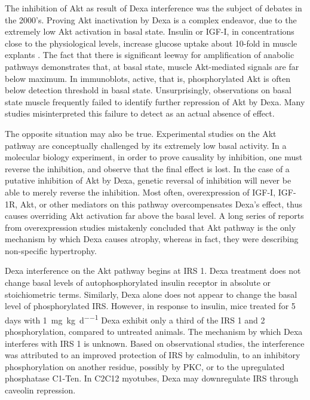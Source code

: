 \documentclass[12pt,english]{report}\usepackage[]{graphicx}\usepackage[]{color}
\begin{document}
The inhibition of Akt as result of Dexa interference was the subject
of debates in the 2000's. Proving Akt inactivation by Dexa is a complex
endeavor, due to the extremely low Akt activation in basal state.
Insulin or IGF-I, in concentrations close to the physiological levels,
increase glucose uptake about 10-fold in muscle explants \citep{weinstein1995glucocorticoid-induced}.
The fact that there is significant leeway for amplification of anabolic
pathways demonstrates that, at basal state, muscle Akt-mediated signals
are far below maximum. In immunoblots, active, that is, phosphorylated
Akt is often below detection threshold in basal state\citep{dardevet1995sensitivity}.
Unsurprisingly, observations on basal state muscle frequently failed
to identify further repression of Akt by Dexa. Many studies misinterpreted
this failure to detect as an actual absence of effect.

The opposite situation may also be true. Experimental studies on the
Akt pathway are conceptually challenged by its extremely low basal
activity. In a molecular biology experiment, in order to prove causality
by inhibition, one must reverse the inhibition, and observe that the
final effect is lost. In the case of a putative inhibition of Akt
by Dexa, genetic reversal of inhibition will never be able to merely
reverse the inhibition. Most often, overexpression of IGF-I, IGF-1R,
Akt, or other mediators on this pathway overcompensates Dexa's effect,
thus causes overriding Akt activation far above the basal level. A
long series of reports from overexpression studies mistakenly concluded
that Akt pathway is the only mechanism by which Dexa causes atrophy,
whereas in fact, they were describing non-specific hypertrophy.

Dexa interference on the Akt pathway begins at IRS 1. Dexa treatment
does not change basal levels of autophosphorylated insulin receptor
in absolute or stoichiometric terms\citep{saad1993modulation,corporeau2006adipose,ishizuka1995effect}.
Similarly, Dexa alone does not appear to change the basal level of
phosphorylated IRS. However, in response to insulin, mice treated
for 5 days with \SI{1}{\milli\gram\per\kilo\gram\per\day} Dexa exhibit
only a third of the IRS 1 and 2 phosphorylation, compared to untreated
animals\citep{rojas2003regulation}. The mechanism by which Dexa interferes
with IRS 1 is unknown. Based on observational studies, the interference
was attributed to an improved protection of IRS by calmodulin\citep{li2000binding},
to an inhibitory phosphorylation on another residue, possibly by PKC\citep{morgan200911beta-hydroxysteroid,ishizuka1995effect},
or to the upregulated phosphatase C1-Ten\citep{koh2013c1-ten}. In
C2C12 myotubes, Dexa may downregulate IRS through caveolin repression\citep{son2015dexamethasone}.
\end{document}
